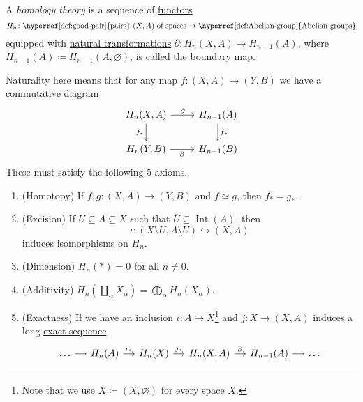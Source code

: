 \begin{definition}\label{def:homology-theory}
	A \emph{homology theory} is a sequence of \hyperref[def:functor]{functors}
	\[
		H_n \colon \text{\hyperref[def:good-pair]{pairs} \((X, A)\) of spaces} \to \text{\hyperref[def:Abelian-group]{Abelian groups}}
	\]
	equipped with \hyperref[def:natural-transformation]{natural transformations} \(\partial \colon H_n(X, A) \to H_{n - 1}(A)\),
	where \(H_{n - 1}(A) \coloneqq H_{n - 1}(A, \varnothing)\), is called the \underline{boundary map}.

	Naturality here means that for any map \(f \colon (X, A) \to (Y, B)\) we have a commutative diagram
	\[
		\begin{tikzcd}
			{H_{n}(X, A)} & {H_{n-1}(A)} \\
			{H_n(Y, B)} & {H_{n-1}(B)}
			\arrow["{\partial }", from=1-1, to=1-2]
			\arrow["{f_\ast}", from=1-2, to=2-2]
			\arrow["{\partial }"', from=2-1, to=2-2]
			\arrow["{f_\ast}"', from=1-1, to=2-1]
		\end{tikzcd}
	\]
	These must satisfy the following \(5\) axioms.
	\begin{enumerate}
		\item (Homotopy) If \(f, g \colon (X, A) \to (Y, B)\) and \(f \simeq g\), then \(f_\ast = g_\ast\).
		\item (Excision) If \(U \subseteq A \subseteq X\) such that \(\overline{U} \subseteq \operatorname{Int} (A)\), then
		      \[
			      \iota \colon (X \setminus U, A \setminus U) \hookrightarrow (X, A)
		      \]
		      induces isomorphisms on \(H_n\).
		\item (Dimension) \(H_n(\ast) = 0\) for all \(n \neq 0\).
		\item (Additivity) \(H_n\left(\coprod_\alpha X_\alpha\right) = \bigoplus_\alpha H_n(X_\alpha)\).
		\item (Exactness) If we have an inclusion \(\iota \colon A \hookrightarrow X\)\footnote{Note that we use
			      \(X\coloneqq (X, \varnothing )\) for every space \(X\).} and \(j \colon X \to (X, A)\) induces a
		      long \hyperref[def:exact-sequence]{exact sequence}
		      \[
			      \begin{tikzcd}[column sep=small]
				      \ldots & {H_n(A)} & {H_n(X)} & {H_{n}(X, A)} & {H_{n-1}(A)} & \ldots
				      \arrow[from=1-1, to=1-2]
				      \arrow["{\iota_\ast}", from=1-2, to=1-3]
				      \arrow["{j_\ast}", from=1-3, to=1-4]
				      \arrow["\partial", from=1-4, to=1-5]
				      \arrow[from=1-5, to=1-6]
			      \end{tikzcd}
		      \]
	\end{enumerate}
\end{definition}

